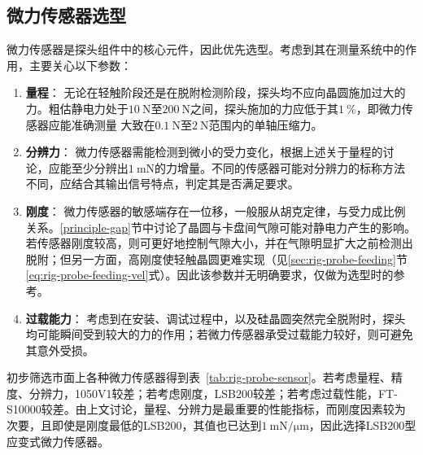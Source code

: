 \subsection{微力传感器选型}\label{sec:rig-probe-sensor}

微力传感器是探头组件中的核心元件，因此优先选型。考虑到其在测量系统中的作用，主要关心以下参数：

\begin{enumerate}
  \item \textbf{量程}：
    无论在轻触阶段还是在脱附检测阶段，探头均不应向晶圆施加过大的力。粗估静电力处于$\SI{10}{\newton}$至$\SI{200}{\newton}$之间，探头施加的力应低于其$1 ~\%$，即微力传感器应能准确测量 大致在$\SI{0.1}{\newton}$至$\SI{2}{\newton}$范围内的单轴压缩力。
  \item \textbf{分辨力}：
    微力传感器需能检测到微小的受力变化，根据上述关于量程的讨论，应能至少分辨出$\SI{1}{\milli\newton}$的力增量。不同的传感器可能对分辨力的标称方法不同，应结合其输出信号特点，判定其是否满足要求。
  \item \textbf{刚度}：
    微力传感器的敏感端存在一位移，一般服从胡克定律，与受力成比例关系。\ref{principle-gap}节中讨论了晶圆与卡盘间气隙可能对静电力产生的影响。若传感器刚度较高，则可更好地控制气隙大小，并在气隙明显扩大之前检测出脱附；但另一方面，高刚度使轻触晶圆更难实现（见\ref{sec:rig-probe-feeding}节\eqref{eq:rig-probe-feeding-vel}式）。因此该参数并无明确要求，仅做为选型时的参考。
  \item \textbf{过载能力}：
    考虑到在安装、调试过程中，以及硅晶圆突然完全脱附时，探头均可能瞬间受到较大的力的作用；若微力传感器承受过载能力较好，则可避免其意外受损。
\end{enumerate}

初步筛选市面上各种微力传感器得到表~\ref{tab:rig-probe-sensor}。若考虑量程、精度、分辨力，1050V1较差；若考虑刚度，LSB200较差；若考虑过载性能，FT-S10000较差。由上文讨论，量程、分辨力是最重要的性能指标，而刚度因素较为次要，且即使是刚度最低的LSB200，其值也已达到$\SI[per-mode=symbol]{1}{\milli\newton\per\micro\meter}$，因此选择LSB200型应变式微力传感器。


